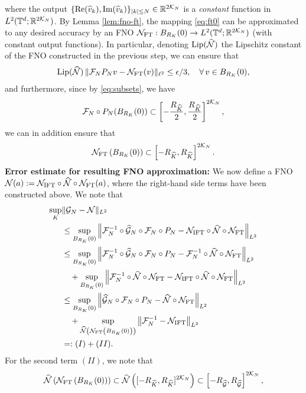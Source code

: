 \documentclass[reqno,a4paper]{amsart}
\begin{document}
where the output $\{\mathrm{Re}(\widehat{v}_k), \mathrm{Im}(\widehat{v}_k)\}_{|k|\le N} \in \mathbb{R}^{2\mathcal{K}_N}$ is a \emph{constant} function in  $L^2(\mathbb{T}^d;\mathbb{R}^{2 \mathcal{K}_N})$.
By Lemma \ref{lem:fno-ft}, the mapping \eqref{eq:ft0} can be approximated to any desired accuracy by an FNO $\mathcal{N}_{\mathrm{FT}}: B_{R_K}(0) \to L^2(\mathbb{T}^d;\mathbb{R}^{2\mathcal{K}_N})$ (with constant output functions). In particular, denoting $\mathrm{Lip}(\widehat{\mathcal{N}})$ the Lipschitz constant of the FNO constructed in the previous step, we can ensure that 
\begin{align} \label{eq:Gft}
\mathrm{Lip}(\widehat{\mathcal{N}})\, 
\Vert \mathcal{F}_N P_N v - \mathcal{N}_{\mathrm{FT}}(v) \Vert_{\ell^2}
\le \epsilon/3, 
\quad \forall \, v\in B_{R_K}(0),
\end{align}
and furthermore, since by \eqref{eq:subsets}, we have
\[
\mathcal{F}_N\circ P_N(B_{R_K}(0))
\subset 
\left[
-\frac{R_{\widehat{K}}}{2},\frac{R_{\widehat{K}}}{2}
\right]^{2\mathcal{K}_N},
\]
we can in addition ensure that 
\[
{\mathcal{N}_{\mathrm{FT}}}
\left(
B_{R_K}(0)
\right)
\subset 
\left[
-{R_{\widehat{K}}}, {R_{\widehat{K}}}
\right]^{2\mathcal{K}_N}.
\]
\textbf{Error estimate for resulting FNO approximation:} We now define a FNO $\mathcal{N}(a) := \mathcal{N}_{\mathrm{IFT}} \circ \widehat{\mathcal{N}} \circ \mathcal{N}_{\mathrm{FT}}(a)$, where the right-hand side terms have been constructed above. We note that 
\begin{align*}
\sup_{K} &\Vert \mathcal{G}_N - \mathcal{N} \Vert_{L^2}
\\
&\le
\sup_{B_{R_K}(0)} 
\left\Vert 
\mathcal{F}_N^{-1} \circ \widehat{\mathcal{G}}_N \circ \mathcal{F}_N \circ P_N
- 
\mathcal{N}_{\mathrm{IFT}} \circ \widehat{\mathcal{N}} \circ \mathcal{N}_{\mathrm{FT}} 
\right\Vert_{L^2}
\\
&\le 
\sup_{B_{R_K}(0)} 
\left\Vert 
\mathcal{F}_N^{-1} \circ \widehat{\mathcal{G}}_N \circ \mathcal{F}_N \circ P_N
- 
\mathcal{F}_N^{-1}  \circ \widehat{\mathcal{N}} \circ \mathcal{N}_{\mathrm{FT}}
\right\Vert_{L^2}
\\
&\quad +
\sup_{ B_{R_K}(0)}
\left\Vert 
\mathcal{F}_N^{-1}  \circ \widehat{\mathcal{N}} \circ \mathcal{N}_{\mathrm{FT}}
- 
\mathcal{N}_{\mathrm{IFT}} \circ \widehat{\mathcal{N}} \circ \mathcal{N}_{\mathrm{FT}}
\right\Vert_{L^2}
\\
&\le 
\sup_{B_{R_K}(0)} 
\left\Vert 
\widehat{\mathcal{G}}_N \circ \mathcal{F}_N \circ P_N
- 
\widehat{\mathcal{N}} \circ \mathcal{N}_{\mathrm{FT}}
\right\Vert_{L^2}
\\
&\quad +
\sup_{\widehat{\mathcal{N}}\left(\mathcal{N}_{\mathrm{FT}}\left(B_{R_K}(0)\right)\right)}
\left\Vert 
\mathcal{F}_N^{-1} 
- 
\mathcal{N}_{\mathrm{IFT}}
\right\Vert_{L^2}
\\
&=: (I) + (II).
\end{align*}
For the second term $(II)$, we note that 
\[
\widehat{\mathcal{N}}\left(\mathcal{N}_{\mathrm{FT}}\left(B_{R_K}(0)\right)\right)
\subset 
\widehat{\mathcal{N}}\left(
[-R_{\widehat{K}}, R_{\widehat{K}}]^{2\mathcal{K}_N}
\right)
\subset
\left[
-{R_{\widehat{\mathcal{G}}}}, {R_{\widehat{\mathcal{G}}}}
\right]^{2\mathcal{K}_N},
\]
\end{document}
